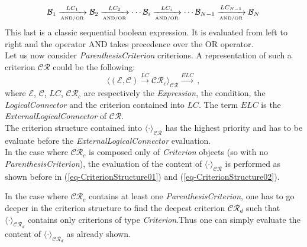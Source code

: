 \documentclass[a4paper,11pt] {article}
\begin{document}
\begin{equation}\label{eq-CriterionStructure02}
\mathcal B_1 \xrightarrow[{\mbox{\tiny AND/OR}}]{LC_1} 
\mathcal B_2 \xrightarrow[{\mbox{\tiny AND/OR}}]{LC_2}
\cdots 
\mathcal B_i \xrightarrow[{\mbox{\tiny AND/OR}}]{LC_i}
\cdots 
\mathcal B_{N-1} \xrightarrow[{\mbox{\tiny AND/OR}}]{LC_{N-1}}
\mathcal B_N
\end{equation}
This last is a classic sequential boolean expression. It is evaluated from left to right and the operator AND takes precedence over the OR operator.\\

Let us now consider {\it ParenthesisCriterion}  criterions. A representation of such a criterion $\mathcal{CR}$ could be the following:
\begin{equation}
\Big \langle  (\mathcal E , \mathcal C) \xrightarrow{LC}  \mathcal{CR}_c  \Big \rangle_{\mathcal{CR}}  \xrightarrow{ELC}\,,
\end{equation}
where $\mathcal E$, $\mathcal C$, $LC$, $\mathcal{CR}_c$ are respectively 
the {\it Expression}, the condition, the {\it LogicalConnector} and the criterion contained into $LC$.
The term $ELC$ is the {\it ExternalLogicalConnector} of $\mathcal{CR}$.\\
The criterion structure contained into $\langle \cdot \rangle_{\mathcal{CR}}$ has the highest priority and has to be evaluate before the {\it ExternalLogicalConnector} evaluation.\\

In the case where $\mathcal{CR}_c$ is composed only of {\it Criterion} objects (so with no
{\it ParenthesisCriterion}), the evaluation of the content of  $\langle \cdot \rangle_{\mathcal{CR}}$  is performed as shown before in (\ref{eq-CriterionStructure01}) and (\ref{eq-CriterionStructure02}).

In the case where $\mathcal{CR}_c$ contains at least one {\it ParenthesisCriterion}, one has to go deeper in the criterion structure to find the deepest criterion $\mathcal{CR}_d$ such that $\langle \cdot \rangle_{\mathcal{CR}_d}$ contains only criterions of type {\it Criterion}.Thus one can simply evaluate the content of  $\langle \cdot \rangle_{\mathcal{CR}_d}$ as already shown.\\
\end{document}
